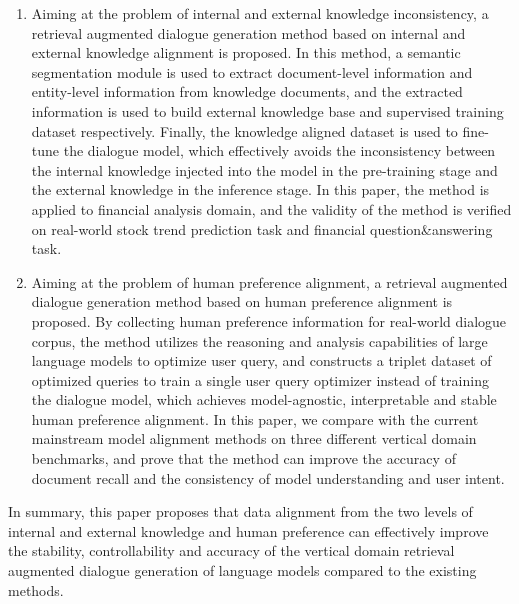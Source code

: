 \begin{enumerate}[topsep = 0 pt, itemsep= 0 pt, parsep=0pt, partopsep=0pt, leftmargin=0pt, itemindent=44pt, labelsep=6pt, listparindent=24pt, label=\arabic*)]
	\item Aiming at the problem of internal and external knowledge inconsistency, a retrieval augmented dialogue generation method based on internal and external knowledge alignment is proposed. In this method, a semantic segmentation module is used to extract document-level information and entity-level information from knowledge documents, and the extracted information is used to build external knowledge base and supervised training dataset respectively. Finally, the knowledge aligned dataset is used to fine-tune the dialogue model, which effectively avoids the inconsistency between the internal knowledge injected into the model in the pre-training stage and the external knowledge in the inference stage. In this paper, the method is applied to financial analysis domain, and the validity of the method is verified on real-world stock trend prediction task and financial question\&answering task.

	\item Aiming at the problem of human preference alignment, a retrieval augmented dialogue generation method based on human preference alignment is proposed. By collecting human preference information for real-world dialogue corpus, the method utilizes the reasoning and analysis capabilities of large language models to optimize user query, and constructs a triplet dataset of optimized queries to train a single user query optimizer instead of training the dialogue model, which achieves model-agnostic, interpretable and stable human preference alignment. In this paper, we compare with the current mainstream model alignment methods on three different vertical domain benchmarks, and prove that the method can improve the accuracy of document recall and the consistency of model understanding and user intent.
\end{enumerate}

In summary, this paper proposes that data alignment from the two levels of internal and external knowledge and human preference can effectively improve the stability, controllability and accuracy of the vertical domain retrieval augmented dialogue generation of language models compared to the existing methods.

